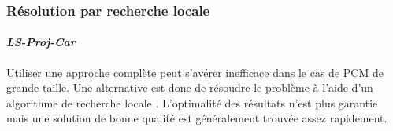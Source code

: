 %
%
%

\subsubsection{Résolution par recherche locale }
\paragraph{\emph{LS-Proj-Car}}
Utiliser une approche complète peut s'avérer inefficace dans le cas de PCM de grande taille. Une alternative est donc de résoudre le problème à l'aide d'un algorithme de recherche locale \cite{Hoos2004}. L'optimalité des résultats n'est plus garantie mais une solution de bonne qualité est généralement trouvée assez rapidement.

